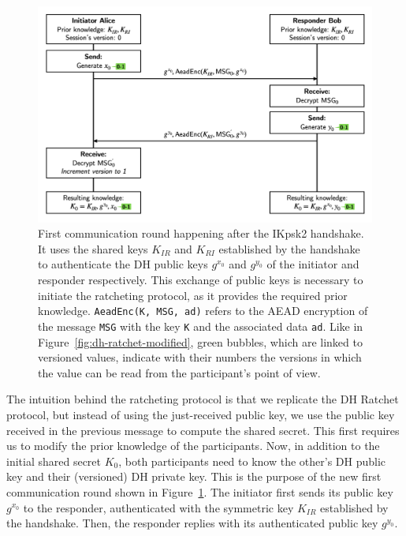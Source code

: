 \begin{figure}
    \centering
    \includegraphics[width=1.0\textwidth]{figures/DH-ratchet-modified-first.png}
    \caption{First communication round happening after the IKpsk2 handshake.
    It uses the shared keys $K_{IR}$ and $K_{RI}$ established by the handshake to authenticate the DH public keys $g^{x_0}$ and $g^{y_0}$ of the initiator and responder respectively.
    This exchange of public keys is necessary to initiate the ratcheting protocol, as it provides the required prior knowledge.
    \texttt{AeadEnc(K, MSG, ad)} refers to the AEAD encryption of the message \texttt{MSG} with the key \texttt{K} and the associated data \texttt{ad}.
    Like in Figure~\ref{fig:dh-ratchet-modified}, green bubbles, which are linked to versioned values, indicate with their numbers the versions in which the value can be read from the participant's point of view.
    }
    \label{fig:dh-ratchet-modified-first}
\end{figure}

The intuition behind the ratcheting protocol is that we replicate the DH Ratchet protocol, but instead of using the just-received public key, we use the public key received in the previous message to compute the shared secret.
This first requires us to modify the prior knowledge of the participants. Now, in addition to the initial shared secret $K_0$, both participants need to know the other's DH public key and their (versioned) DH private key.
This is the purpose of the new first communication round shown in Figure~\ref{fig:dh-ratchet-modified-first}. 
The initiator first sends its public key $g^{x_0}$ to the responder, authenticated with the symmetric key $K_{IR}$ established by the handshake. Then, the responder replies with its authenticated public key $g^{y_0}$.

